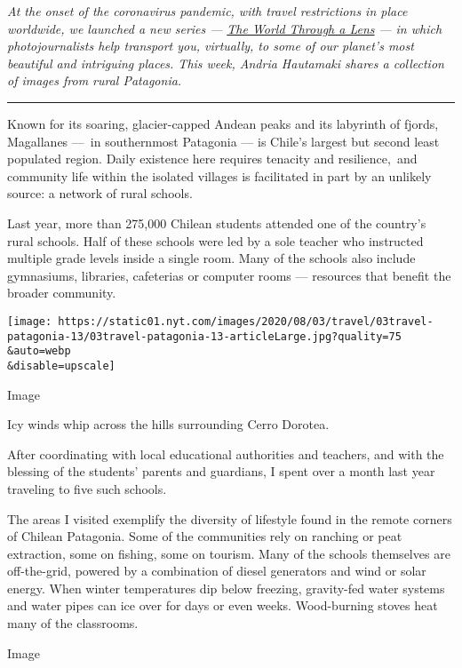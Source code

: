 \emph{At the onset of the coronavirus pandemic, with travel restrictions
in place worldwide, we launched a new series ---}
\href{https://www.nytimes.com/column/the-world-through-a-lens}{\emph{The
World Through a Lens}} \emph{--- in which photojournalists help
transport you, virtually, to some of our planet's most beautiful and
intriguing places. This week, Andria Hautamaki shares a collection of
images from rural Patagonia.}

\begin{center}\rule{0.5\linewidth}{\linethickness}\end{center}

Known for its soaring, glacier-capped Andean peaks and its labyrinth of
fjords, Magallanes ---~in southernmost Patagonia --- is Chile's largest
but second least populated region. Daily existence here requires
tenacity and resilience,~and community life within the isolated villages
is facilitated in part by an unlikely source: a network of rural
schools.

Last year, more than 275,000 Chilean students attended one of the
country's rural schools. Half of these schools were led by a sole
teacher who instructed multiple grade levels inside a single room. Many
of the schools also include gymnasiums, libraries, cafeterias or
computer rooms --- resources that benefit the broader community.

\texttt{[image: https://static01.nyt.com/images/2020/08/03/travel/03travel-patagonia-13/03travel-patagonia-13-articleLarge.jpg?quality=75\\\&auto=webp\\\&disable=upscale]}

Image

Icy winds whip across the hills surrounding Cerro Dorotea.

After coordinating with local educational authorities and teachers, and
with the blessing of the students' parents and guardians, I spent over a
month last year traveling to five such schools.

The areas I visited exemplify the diversity of lifestyle found in the
remote corners of Chilean Patagonia. Some of the communities rely on
ranching or peat extraction, some on fishing, some on tourism. Many of
the schools themselves are off-the-grid, powered by a combination of
diesel generators and wind or solar energy. When winter temperatures dip
below freezing, gravity-fed water systems and water pipes can ice over
for days or even weeks. Wood-burning stoves heat many of the classrooms.

Image

